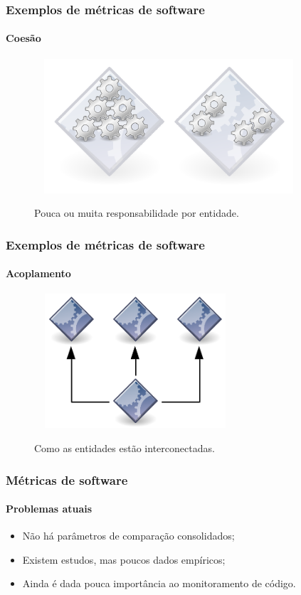 \documentclass{beamer}
\begin{document}
\begin{frame}
  \frametitle{Exemplos de métricas de software}
  \framesubtitle{Coesão}

  \begin{figure}
    \begin{center}
      \includegraphics[width=10cm, height=5cm]{images/cohesion.png}
      \label{fig: cohesion}
      \caption{Pouca ou muita responsabilidade por entidade.}
    \end{center}
  \end{figure}
\end{frame}

\begin{frame}
  \frametitle{Exemplos de métricas de software}
  \framesubtitle{Acoplamento}

  \begin{figure}
    \begin{center}
      \includegraphics[width=7.5cm, height=5cm]{images/coupling.png}
      \label{fig: coupling}
      \caption{Como as entidades estão interconectadas.}
    \end{center}
  \end{figure}
\end{frame}

\begin{frame}
  \frametitle{Métricas de software}
  \framesubtitle{Problemas atuais}
  
  \begin{itemize}
    \item Não há parâmetros de comparação consolidados;
    \item Existem estudos, mas poucos dados empíricos;
    \item Ainda é dada pouca importância ao monitoramento de código.
  \end{itemize}
\end{frame}
\end{document}
